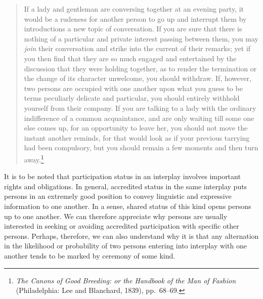 \documentclass[twoside,symmetric,nobib,justified]{tufte-book}
\begin{document}
\begin{quote}
If a lady and gentleman are conversing together at an evening party, it
would be a rudeness for another person to go up and interrupt them by
introductions a new topic of conversation. If you are sure that there is
nothing of a particular and private interest passing between them, you
may \emph{join} their conversation and strike into the current of their
remarks; yet if you then find that they are so much engaged and
entertained by the discussion that they were holding together, as to
render the termination or the change of its character unwelcome, you
should withdraw. If, however, two persons are occupied with one another
upon what you guess to be terms peculiarly delicate and particular, you
should entirely withhold yourself from their company. If you are talking
to a lady with the ordinary indifference of a common acquaintance, and
are only waiting till some one else comes up, for an opportunity to
leave her, you should not move the instant another reminds, for that
would look as if your previous tarrying had been compulsory, but you
should remain a few moments and then turn away.\footnote{\emph{The
  Canons of Good Breeding: or the Handbook of the Man of Fashion}
  (Philadelphia: Lee and Blanchard, 1839), pp.~68--69.}
\end{quote}

\noindent It is to be noted that participation status in an interplay involves
important rights and obligations. In general, accredited status in the
same interplay puts persons in an extremely good position to convey
linguistic and expressive information to one another. In a sense, shared
status of this kind opens persons up to one another. We can therefore
appreciate why persons are usually interested in seeking or avoiding
accredited participation with specific other persons. Perhaps,
therefore, we can also understand why it is that any alternation in the
likelihood or probability of two persons entering into interplay with
one another tends to be marked by ceremony of some kind.
\end{document}
